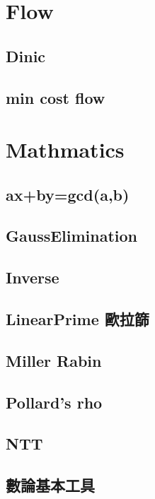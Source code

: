 \section{Flow}

\subsection{Dinic}

\subsection{min cost flow}


\section{Mathmatics}

\subsection{ax+by=gcd(a,b)}

\subsection{GaussElimination}

\subsection{Inverse}

\subsection{LinearPrime 歐拉篩}

\subsection{Miller Rabin}

\subsection{Pollard's rho}

\subsection{NTT}

\subsection{數論基本工具}

